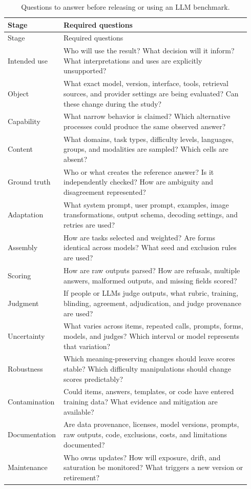 \documentclass[12pt]{article}
\begin{document}
\begin{longtable}{p{0.18\linewidth}p{0.76\linewidth}}
\caption{Questions to answer before releasing or using an LLM benchmark.}\label{tab:checklist}\\
\toprule
Stage & Required questions \\
\midrule
\endfirsthead
\toprule
Stage & Required questions \\
\midrule
\endhead
Intended use & Who will use the result? What decision will it inform? What interpretations and uses are explicitly unsupported? \\
Object & What exact model, version, interface, tools, retrieval sources, and provider settings are being evaluated? Can these change during the study? \\
Capability & What narrow behavior is claimed? Which alternative processes could produce the same observed answer? \\
Content & What domains, task types, difficulty levels, languages, groups, and modalities are sampled? Which cells are absent? \\
Ground truth & Who or what creates the reference answer? Is it independently checked? How are ambiguity and disagreement represented? \\
Adaptation & What system prompt, user prompt, examples, image transformations, output schema, decoding settings, and retries are used? \\
Assembly & How are tasks selected and weighted? Are forms identical across models? What seed and exclusion rules are used? \\
Scoring & How are raw outputs parsed? How are refusals, multiple answers, malformed outputs, and missing fields scored? \\
Judgment & If people or LLMs judge outputs, what rubric, training, blinding, agreement, adjudication, and judge provenance are used? \\
Uncertainty & What varies across items, repeated calls, prompts, forms, models, and judges? Which interval or model represents that variation? \\
Robustness & Which meaning-preserving changes should leave scores stable? Which difficulty manipulations should change scores predictably? \\
Contamination & Could items, answers, templates, or code have entered training data? What evidence and mitigation are available? \\
Documentation & Are data provenance, licenses, model versions, prompts, raw outputs, code, exclusions, costs, and limitations documented? \\
Maintenance & Who owns updates? How will exposure, drift, and saturation be monitored? What triggers a new version or retirement? \\
\bottomrule
\end{longtable}
\end{document}

